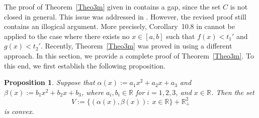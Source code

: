 \documentclass[]{interact}
\theoremstyle{plain}%
\newtheorem{proposition}[theorem]{Proposition}
\theoremstyle{definition}
\theoremstyle{remark}
\begin{document}
	The proof of Theorem~\ref{Theo3m} given in \cite{TuyTuan2013} contains a gap, since the set $C$ is not closed in general. This issue was addressed in \cite[Corollary~10.10]{Tuy2016}. However, the revised proof still contains an illogical argument. More precisely, Corollary~10.8 in \cite{Tuy2016} cannot be applied to the case where there exists no $x\in [a,b]$ such that $f(x)<t_1'$ and $g(x)<t_2'$. Recently, Theorem~\ref{Theo3m} was proved in \cite{BazanOpazo2016} using a different approach. In this section, we provide a complete  proof of Theorem~\ref{Theo3m}. To this end, we first establish the following proposition.
	
	\begin{proposition}\label{Theo3n}
		Suppose that $\alpha(x):=a_1x^2+a_2x+a_3$ and $\beta(x):=b_1x^2+b_2x+b_3$, where $a_i,b_i\in\mathbb{R}$ for $i=1,2,3$, and $x\in\mathbb{R}$. 	 
		Then the set
		$$
		V:= \{(\alpha(x), \beta(x)):\; x\in \mathbb{R}\}+\mathbb{R}^{2}_+
		$$
		is convex.                   
	\end{proposition}
	
\end{document}
